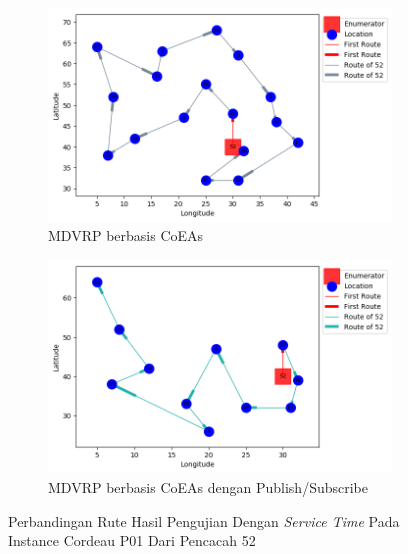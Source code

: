 \begin{figure}[H]
	\centering
	\begin{subfigure}[t]{\textwidth}
		\centering
		\includegraphics[width=\textwidth]{Resources/Images/cordeau_p01_tw/cordeau_p01_tw_52_coes}
		\caption{MDVRP berbasis CoEAs}
		\label{fig:cordeau_p01_tw_52_coes}
	\end{subfigure}
	\begin{subfigure}[t]{\textwidth}
		\centering
		\includegraphics[width=\textwidth]{Resources/Images/cordeau_p01_tw/cordeau_p01_tw_52_pubsub_coes}
		\caption{MDVRP berbasis CoEAs dengan Publish/Subscribe}
		\label{fig:cordeau_p01_tw_52_pubsub_coes}
	\end{subfigure}
	\caption{Perbandingan Rute Hasil Pengujian Dengan \textit{Service Time} Pada Instance Cordeau P01 Dari Pencacah 52}
	\label{fig:cordeau_p01_tw_52}
\end{figure}


